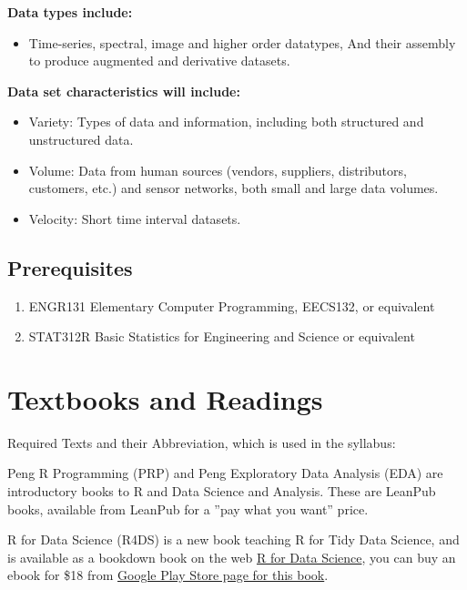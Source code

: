 \documentclass[10pt]{article} %
\begin{document}
    {\bf Data types include:}
    \begin{itemize}
    	\item Time-series, spectral, image and higher order datatypes,
    	\subitem And their assembly to produce augmented and derivative datasets.
    \end{itemize}

    {\bf Data set characteristics will include:}
    \begin{itemize}
    	\item Variety: Types of data and information, including both structured and unstructured data.
    	\item Volume: Data from human sources (vendors, suppliers, distributors, customers, etc.) and sensor networks,  both small and large data volumes.
    	\item Velocity: Short time interval datasets.
    \end{itemize}

  \subsection{Prerequisites}

    \begin{enumerate}
      \item ENGR131 Elementary Computer Programming, EECS132, or equivalent
      \item STAT312R Basic Statistics for Engineering and Science or equivalent
    \end{enumerate}

\section{Textbooks and Readings}

  Required Texts and their Abbreviation, which is used in the syllabus:

  Peng R Programming (PRP) and Peng Exploratory Data Analysis (EDA) are introductory books to R and Data Science and Analysis.
  These are  LeanPub books, available from LeanPub for a ”pay what you want” price.

  R for Data Science (R4DS) is a new book teaching R for Tidy Data Science, and is available as a bookdown book on the web \href{http://r4ds.had.co.nz/}{R for Data Science}, you can buy an ebook for \$18 from \href{https://play.google.com/store/books/details/Hadley_Wickham_R_for_Data_Science?id=I6y3DQAAQBAJ}{Google Play Store page for this book}.
\end{document}
